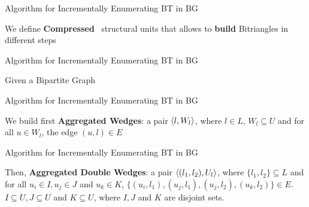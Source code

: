 \begin{frame}[fragile]{Algorithm for Incrementally Enumerating BT in BG}
  \begin{center}
    \large We define \textbf{Compressed}~\cite{Lai} structural units that allows to \textbf{build} Bitriangles in different steps
  \end{center}    
\end{frame}

\begin{frame}[fragile]{Algorithm for Incrementally Enumerating BT in BG}
  \begin{center}
    Given a Bipartite Graph
  \end{center}    
  \begin{figure}
    \centering
  \end{figure}
\end{frame}

\begin{frame}[fragile]{Algorithm for Incrementally Enumerating BT in BG}
  \begin{center}
    We build first \textbf{Aggregated Wedges}: a pair $\left\langle l, W_l \right\rangle$, where $l \in L$, $W_l \subseteq U$ and for all $u \in W_l$, the edge  $(u,l)\in E$
  \end{center}    
  \begin{figure}
    \centering
  \end{figure}
\end{frame}

\begin{frame}[fragile]{Algorithm for Incrementally Enumerating BT in BG}
  \begin{center}
    Then, \textbf{Aggregated Double Wedges}: a pair  $\left\langle (l_1, l_2), U_l \right\rangle$, where $\{l_1,l_2\}\subseteq L$ and  for all $u_i \in I, u_j \in J$ and $u_k \in K$, $\{(u_i, l_1), (u_j, l_1), (u_j, l_2), (u_k, l_2)\} \in E$.
    $I \subseteq U, J \subseteq U$ and $K \subseteq U$, where $I, J$ and $K$ are disjoint sets. 
  \end{center}    
  \begin{figure}
    \centering
  \end{figure}
\end{frame}

